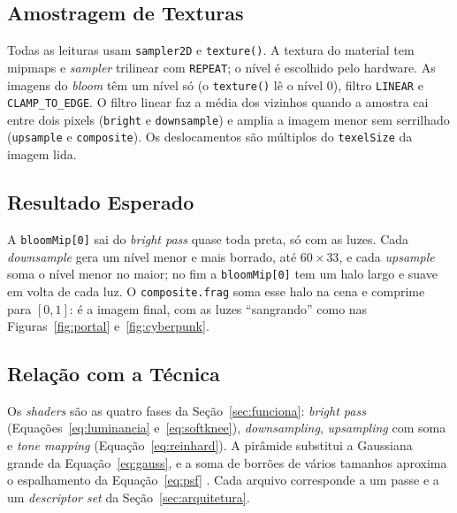 \subsection{Amostragem de Texturas}
Todas as leituras usam \texttt{sampler2D} e \texttt{texture()}. A textura do material tem mipmaps e \textit{sampler} trilinear com \texttt{REPEAT}; o nível é escolhido pelo hardware. As imagens do \textit{bloom} têm um nível só (o \texttt{texture()} lê o nível 0), filtro \texttt{LINEAR} e \texttt{CLAMP\_TO\_EDGE}. O filtro linear faz a média dos vizinhos quando a amostra cai entre dois pixels (\texttt{bright} e \texttt{downsample}) e amplia a imagem menor sem serrilhado (\texttt{upsample} e \texttt{composite}). Os deslocamentos são múltiplos do \texttt{texelSize} da imagem lida.

\subsection{Resultado Esperado}
A \texttt{bloomMip[0]} sai do \textit{bright pass} quase toda preta, só com as luzes. Cada \textit{downsample} gera um nível menor e mais borrado, até $60 \times 33$, e cada \textit{upsample} soma o nível menor no maior; no fim a \texttt{bloomMip[0]} tem um halo largo e suave em volta de cada luz. O \texttt{composite.frag} soma esse halo na cena e comprime para $[0, 1]$: é a imagem final, com as luzes ``sangrando'' como nas Figuras~\ref{fig:portal} e~\ref{fig:cyberpunk}.

\subsection{Relação com a Técnica}
Os \textit{shaders} são as quatro fases da Seção~\ref{sec:funciona}: \textit{bright pass} (Equações~\ref{eq:luminancia} e~\ref{eq:softknee}), \textit{downsampling}, \textit{upsampling} com soma e \textit{tone mapping} (Equação~\ref{eq:reinhard}). A pirâmide substitui a Gaussiana grande da Equação~\ref{eq:gauss}, e a soma de borrões de vários tamanhos aproxima o espalhamento da Equação~\ref{eq:psf} \cite{spencer1995glare}. Cada arquivo corresponde a um passe e a um \textit{descriptor set} da Seção~\ref{sec:arquitetura}.
\fussy
